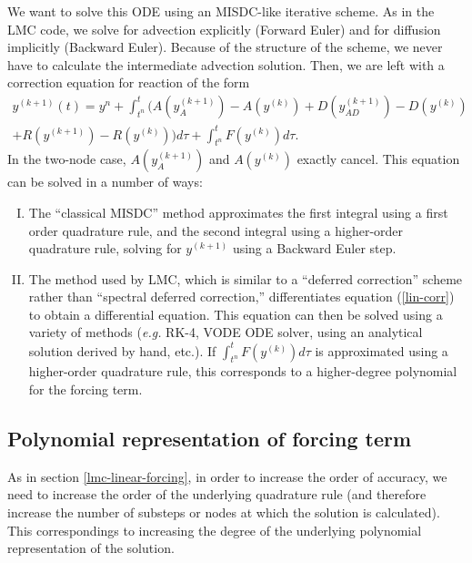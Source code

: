 \documentclass[12pt]{article}
\begin{document}
We want to solve this ODE using an MISDC-like iterative scheme. 
As in the LMC code, we solve for advection explicitly (Forward Euler) and 
for diffusion implicitly (Backward Euler). Because of the structure of the 
scheme, we never have to calculate the intermediate advection solution. Then, we 
are left with a correction equation for reaction of the form
\begin{equation}
\label{lin-corr}
\begin{split}
    y^{(k+1)}(t) = y^n + \int_{t^n}^t \Big(
        A(y^{(k+1)}_A) - A(y^{(k)})
      + D(y^{(k+1)}_{AD}) - D(y^{(k)}) \\
      + R(y^{(k+1)}) - R(y^{(k)})
      \Big) d\tau
      + \int_{t^n}^t F(y^{(k)}) d\tau.
\end{split}
\end{equation}
In the two-node case, $A(y^{(k+1)}_A)$ and $A(y^{(k)})$ exactly cancel.
This equation can be solved in a number of ways:
\begin{enumerate}[I.]
    \item  The ``classical MISDC'' method approximates the first integral using 
           a first order quadrature rule, and the second integral using a 
           higher-order quadrature rule, solving for $y^{(k+1)}$ using a 
           Backward Euler step. \label{classic-misdc}
    \item  The method used by LMC, which is similar to a ``deferred correction'' 
           scheme rather than ``spectral deferred correction,'' differentiates 
           equation (\ref{lin-corr}) to obtain a differential equation. This 
           equation can then be solved using a variety of methods (\textit{e.g.} 
           RK-4, VODE ODE solver, using an analytical solution derived by hand, 
           etc.). If $\int_{t^n}^t F(y^{(k)}) d\tau$ is approximated using a 
           higher-order quadrature rule, this corresponds to a higher-degree 
           polynomial for the forcing term. \label{misdc-ode}
\end{enumerate}

\subsection{Polynomial representation of forcing term}
As in section \ref{lmc-linear-forcing}, in order to increase the order of 
accuracy, we need to increase the order of the underlying quadrature rule 
(and therefore increase the number of substeps or nodes at which the solution 
is calculated). This correspondings to increasing the degree of the underlying 
polynomial representation of the solution.
\end{document}
